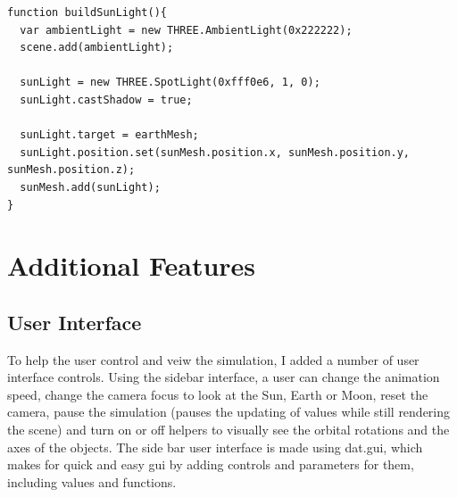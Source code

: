 \documentclass[12pt]{article}
\begin{document}
\begin{lstlisting}
function buildSunLight(){
  var ambientLight = new THREE.AmbientLight(0x222222);
  scene.add(ambientLight);

  sunLight = new THREE.SpotLight(0xfff0e6, 1, 0);
  sunLight.castShadow = true;

  sunLight.target = earthMesh;    
  sunLight.position.set(sunMesh.position.x, sunMesh.position.y, sunMesh.position.z);
  sunMesh.add(sunLight);
}
\end{lstlisting}


\section{Additional Features}
\subsection{User Interface}
To help the user control and veiw the simulation, I added a number of user interface controls. Using the sidebar interface, a user can change the animation speed, change the camera focus to look at the Sun, Earth or Moon, reset the camera, pause the simulation (pauses the updating of values while still rendering the scene) and turn on or off helpers to visually see the orbital rotations and the axes of the objects. The side bar user interface is made using dat.gui\cite{datgui}, which makes for quick and easy gui by adding controls and parameters for them, including values and functions.
\end{document}

